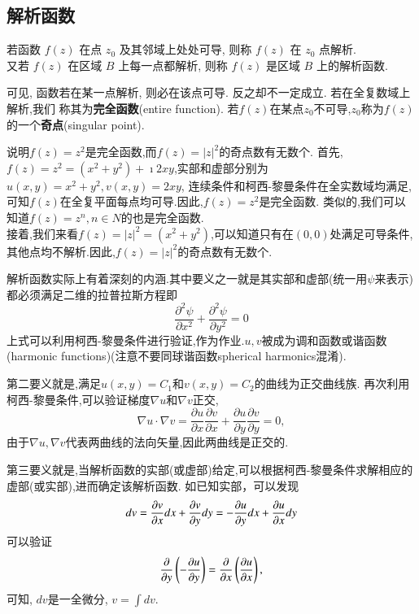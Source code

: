 \subsection{解析函数}
\begin{Definition}
若函数 $f(z)$ 在点 $z_0$ 及其邻域上处处可导, 则称 $f(z)$ 在 $z_0$ 点解析.\\
 又若 $f(z)$ 在区域 $B$ 上每一点都解析, 则称 $f(z)$ 是区域 $B$ 上的解析函数.
\end{Definition} 
 可见, 函数若在某一点解析, 则必在该点可导. 反之却不一定成立. 若在全复数域上解析,我们
 称其为{\bf 完全函数}(entire function).
 若$f(z)$在某点$z_0$不可导,$z_0$称为$f(z)$的一个{\bf 奇点}(singular point).

 \begin{examplebox}{说明$f(z)=z^2$是完全函数,而$f(z)=|z|^2$的奇点数有无数个.}
    首先,$f(z) =z^2 = (x^2 + y ^2) + \imath 2 x y$,实部和虚部分别为$u(x,y) = x^2+ y^2, v(x,y)=2x y$,
连续条件和柯西-黎曼条件在全实数域均满足,可知$f(z)$在全复平面每点均可导.因此,$f(z)=z^2$是完全函数.
类似的,我们可以知道$f(z)=z^n, n\in N$的也是完全函数.\\
    接着,我们来看$f(z) = |z|^2 = (x^2 + y ^2)$,可以知道只有在$(0,0)$处满足可导条件,其他点均不解析.因此,$f(z)=|z|^2$的奇点数有无数个.
 \end{examplebox}

 解析函数实际上有着深刻的内涵.其中要义之一就是其实部和虚部(统一用$\psi$来表示)都必须满足二维的拉普拉斯方程即
 \begin{equation}
    \label{eq:Laplace_eq}
    \frac{\partial^2 \psi}{\partial x^2}+\frac{\partial^2 \psi}{\partial y^2}=0
 \end{equation}
上式可以利用柯西-黎曼条件进行验证,作为作业.$u,v$被成为调和函数或谐函数(harmonic functions)(注意不要同球谐函数spherical harmonics混淆).

第二要义就是,满足$u(x,y) = C_1$和$v(x,y)= C_2$的曲线为正交曲线族.
再次利用柯西-黎曼条件,可以验证梯度$\nabla u $和$\nabla v$正交,
\begin{equation}
    \nabla u \cdot \nabla v = \frac{\partial u}{\partial x} 
    \frac{\partial v}{\partial x}+\frac{\partial u}{\partial y} \frac{\partial v}{\partial y}=0 ,
\end{equation}
由于$\nabla u, \nabla v$代表两曲线的法向矢量,因此两曲线是正交的.

第三要义就是,当解析函数的实部(或虚部)给定,可以根据柯西-黎曼条件求解相应的虚部(或实部),进而确定该解析函数.
如已知实部，可以发现
\begin{equation}
    d v = \frac{\partial{v}}{\partial{x}} dx + \frac{\partial{v}}{\partial{y}} dy = -\frac{\partial{u}}{\partial{y}} dx + \frac{\partial{u}}{\partial{x}} dy
\end{equation}
可以验证 
$$
\frac{\partial{}}{\partial{y}} \left( - \frac{\partial{u}}{\partial{y}} \right) = \frac{\partial{}}{\partial{x}} \left( \frac{\partial{u}}{\partial{x}} \right) , 
$$
可知, $dv$是一全微分, $v = \int dv$.

